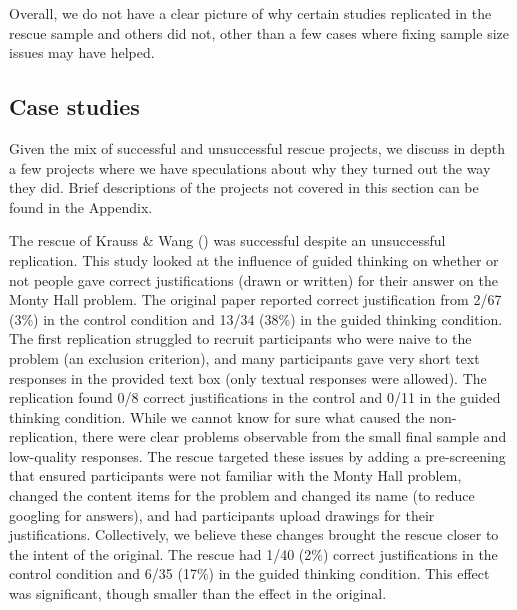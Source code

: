 \documentclass[
  english,
  a4paper,
]{article}
\begin{document}
Overall, we do not have a clear picture of why certain studies replicated in the rescue sample and others did not, other than a few cases where fixing sample size issues may have helped.

\subsection{Case studies}\label{case-studies}

Given the mix of successful and unsuccessful rescue projects, we discuss in depth a few projects where we have speculations about why they turned out the way they did.
Brief descriptions of the projects not covered in this section can be found in the Appendix.

The rescue of Krauss \& Wang () was successful despite an unsuccessful replication.
This study looked at the influence of guided thinking on whether or not people gave correct justifications (drawn or written) for their answer on the Monty Hall problem.
The original paper reported correct justification from 2/67 (3\%) in the control condition and 13/34 (38\%) in the guided thinking condition.
The first replication struggled to recruit participants who were naive to the problem (an exclusion criterion), and many participants gave very short text responses in the provided text box (only textual responses were allowed).
The replication found 0/8 correct justifications in the control and 0/11 in the guided thinking condition.
While we cannot know for sure what caused the non-replication, there were clear problems observable from the small final sample and low-quality responses.
The rescue targeted these issues by adding a pre-screening that ensured participants were not familiar with the Monty Hall problem, changed the content items for the problem and changed its name (to reduce googling for answers), and had participants upload drawings for their justifications.
Collectively, we believe these changes brought the rescue closer to the intent of the original.
The rescue had 1/40 (2\%) correct justifications in the control condition and 6/35 (17\%) in the guided thinking condition.
This effect was significant, though smaller than the effect in the original.
\end{document}
